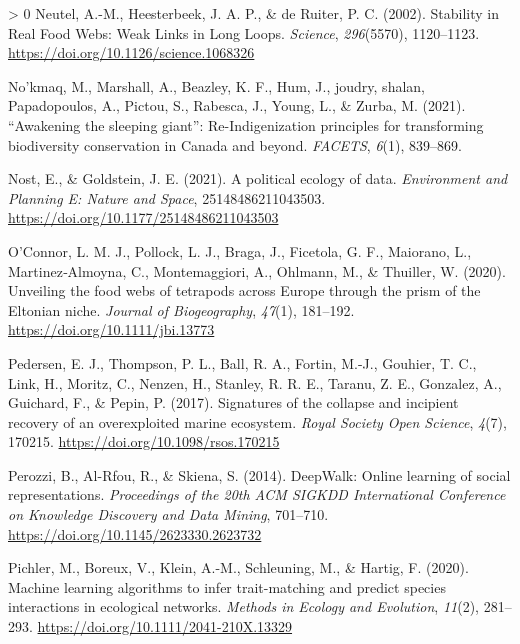 \documentclass[10pt,oneside]{article}
\newlength{\cslhangindent}
\newenvironment{CSLReferences}[3] %
 {%
  \setlength{\parindent}{0pt}
  \ifodd #1 \everypar{\setlength{\hangindent}{\cslhangindent}}\ignorespaces\fi
  \ifnum #2 > 0
  \setlength{\parskip}{#2\baselineskip}
  \fi
 }%
 {}
\begin{document}
\begin{CSLReferences}{1}{0}
\leavevmode\hypertarget{ref-Neutel2002StaRea}{}%
Neutel, A.-M., Heesterbeek, J. A. P., \& de Ruiter, P. C. (2002).
Stability in Real Food Webs: Weak Links in Long Loops. \emph{Science},
\emph{296}(5570), 1120--1123.
\url{https://doi.org/10.1126/science.1068326}

\leavevmode\hypertarget{ref-Nokmaq2021AwaSle}{}%
No'kmaq, M., Marshall, A., Beazley, K. F., Hum, J., joudry, shalan,
Papadopoulos, A., Pictou, S., Rabesca, J., Young, L., \& Zurba, M.
(2021). {``Awakening the sleeping giant''}: Re-Indigenization principles
for transforming biodiversity conservation in Canada and beyond.
\emph{FACETS}, \emph{6}(1), 839--869.

\leavevmode\hypertarget{ref-Nost2021PolEco}{}%
Nost, E., \& Goldstein, J. E. (2021). A political ecology of data.
\emph{Environment and Planning E: Nature and Space}, 25148486211043503.
\url{https://doi.org/10.1177/25148486211043503}

\leavevmode\hypertarget{ref-OConnor2020UnvFoo}{}%
O'Connor, L. M. J., Pollock, L. J., Braga, J., Ficetola, G. F.,
Maiorano, L., Martinez‐Almoyna, C., Montemaggiori, A., Ohlmann, M., \&
Thuiller, W. (2020). Unveiling the food webs of tetrapods across Europe
through the prism of the Eltonian niche. \emph{Journal of Biogeography},
\emph{47}(1), 181--192. \url{https://doi.org/10.1111/jbi.13773}

\leavevmode\hypertarget{ref-Pedersen2017SigCol}{}%
Pedersen, E. J., Thompson, P. L., Ball, R. A., Fortin, M.-J., Gouhier,
T. C., Link, H., Moritz, C., Nenzen, H., Stanley, R. R. E., Taranu, Z.
E., Gonzalez, A., Guichard, F., \& Pepin, P. (2017). Signatures of the
collapse and incipient recovery of an overexploited marine ecosystem.
\emph{Royal Society Open Science}, \emph{4}(7), 170215.
\url{https://doi.org/10.1098/rsos.170215}

\leavevmode\hypertarget{ref-Perozzi2014DeeOnl}{}%
Perozzi, B., Al-Rfou, R., \& Skiena, S. (2014). DeepWalk: Online
learning of social representations. \emph{Proceedings of the 20th ACM
SIGKDD International Conference on Knowledge Discovery and Data Mining},
701--710. \url{https://doi.org/10.1145/2623330.2623732}

\leavevmode\hypertarget{ref-Pichler2020MacLea}{}%
Pichler, M., Boreux, V., Klein, A.-M., Schleuning, M., \& Hartig, F.
(2020). Machine learning algorithms to infer trait-matching and predict
species interactions in ecological networks. \emph{Methods in Ecology
and Evolution}, \emph{11}(2), 281--293.
\url{https://doi.org/10.1111/2041-210X.13329}


\end{CSLReferences}
\end{document}
